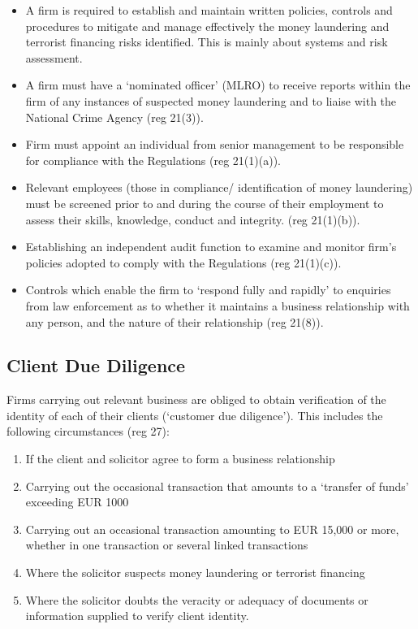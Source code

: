 \documentclass[
]{article}
\providecommand{\tightlist}{%
  \setlength{\itemsep}{0pt}\setlength{\parskip}{0pt}}
\begin{document}
\begin{itemize}
\tightlist
\item
  A firm is required to establish and maintain written policies,
  controls and procedures to mitigate and manage effectively the money
  laundering and terrorist financing risks identified. This is mainly
  about systems and risk assessment.
\item
  A firm must have a `nominated officer' (MLRO) to receive reports
  within the firm of any instances of suspected money laundering and to
  liaise with the National Crime Agency (reg 21(3)).
\item
  Firm must appoint an individual from senior management to be
  responsible for compliance with the Regulations (reg 21(1)(a)).
\item
  Relevant employees (those in compliance/ identification of money
  laundering) must be screened prior to and during the course of their
  employment to assess their skills, knowledge, conduct and integrity.
  (reg 21(1)(b)).
\item
  Establishing an independent audit function to examine and monitor
  firm's policies adopted to comply with the Regulations (reg 21(1)(c)).
\item
  Controls which enable the firm to `respond fully and rapidly' to
  enquiries from law enforcement as to whether it maintains a business
  relationship with any person, and the nature of their relationship
  (reg 21(8)).
\end{itemize}

\hypertarget{client-due-diligence}{%
\subsection{Client Due Diligence}\label{client-due-diligence}}

Firms carrying out relevant business are obliged to obtain verification
of the identity of each of their clients (`customer due diligence').
This includes the following circumstances (reg 27):

\begin{enumerate}
\def\labelenumi{\arabic{enumi}.}
\tightlist
\item
  If the client and solicitor agree to form a business relationship
\item
  Carrying out the occasional transaction that amounts to a `transfer of
  funds' exceeding EUR 1000
\item
  Carrying out an occasional transaction amounting to EUR 15,000 or
  more, whether in one transaction or several linked transactions
\item
  Where the solicitor suspects money laundering or terrorist financing
\item
  Where the solicitor doubts the veracity or adequacy of documents or
  information supplied to verify client identity.
\end{enumerate}
\end{document}
